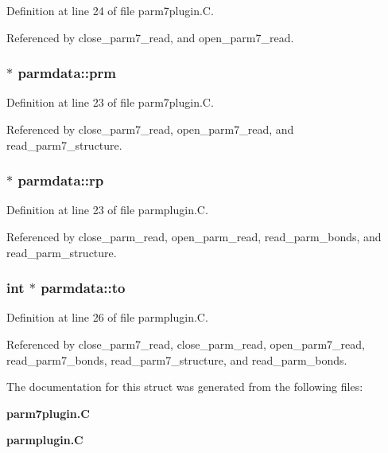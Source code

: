 Definition at line 24 of file parm7plugin.C.

Referenced by close\_\-parm7\_\-read, and open\_\-parm7\_\-read.
\subsubsection{$\ast$ parmdata::prm}\label{structparmdata_m0}




Definition at line 23 of file parm7plugin.C.

Referenced by close\_\-parm7\_\-read, open\_\-parm7\_\-read, and read\_\-parm7\_\-structure.
\subsubsection{$\ast$ parmdata::rp}\label{structparmdata_m6}




Definition at line 23 of file parmplugin.C.

Referenced by close\_\-parm\_\-read, open\_\-parm\_\-read, read\_\-parm\_\-bonds, and read\_\-parm\_\-structure.
\subsubsection{\setlength{\rightskip}{0pt plus 5cm}int $\ast$ parmdata::to}\label{structparmdata_m5}




Definition at line 26 of file parmplugin.C.

Referenced by close\_\-parm7\_\-read, close\_\-parm\_\-read, open\_\-parm7\_\-read, read\_\-parm7\_\-bonds, read\_\-parm7\_\-structure, and read\_\-parm\_\-bonds.

The documentation for this struct was generated from the following files:\begin{CompactItemize}
\item 
{\bf parm7plugin.C}\item 
{\bf parmplugin.C}\end{CompactItemize}
